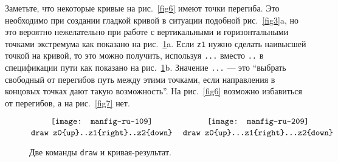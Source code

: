 \documentclass{article} %
\newcommand\mathcenter[1]{\vcenter{\hbox{#1}}}
\begin{document}
Заметьте, что некоторые кривые на рис.~\ref{fig6} имеют 
точки перегиба.
Это необходимо при создании гладкой кривой в ситуации подобной 
рис.~\ref{fig3}a, но это вероятно нежелательно при работе с 
вертикальными и горизонтальными точками экстремума как показано 
на рис.~\ref{fig8}a.
Если \verb|z1| нужно сделать наивысшей точкой на кривой, то 
это можно получить, используя 
\verb|...| вместо \verb|..| в 
спецификации пути как показано на рис.~\ref{fig8}b.
Значение \verb|...| --- это ``выбрать свободный от перегибов путь между 
этими точками, если направления в концовых точках дают такую возможность''. 
На рис.~\ref{fig6} возможно избавиться от перегибов, а на рис.~\ref{fig7} нет.  

\begin{figure}[htp]
$$ {\mathcenter{\texttt{[image: manfig-ru-109]}} \atop
    \hbox{\verb|draw z0{up}..z1{right}..z2{down}|}}
  \quad
   {\mathcenter{\texttt{[image: manfig-ru-209]}} \atop
    \hbox{\verb|draw z0{up}...z1{right}...z2{down}|}}
$$
\caption{Две команды {\tt draw} и кривая-результат.}
\label{fig8}
\end{figure}
\end{document}
